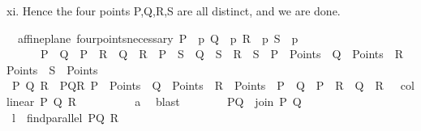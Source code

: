\begin{isabellebody}
\begin{isamarkuptext}
xi. Hence the four points P,Q,R,S are all distinct, and we are done. 
\caleb \seiji%
\end{isamarkuptext}\isamarkuptrue%
\isamarkupfalse%
\ {\isacharparenleft}{\kern0pt}\ affine{\isacharunderscore}{\kern0pt}plane{\isacharparenright}{\kern0pt}\ four{\isacharunderscore}{\kern0pt}points{\isacharunderscore}{\kern0pt}necessary{\isacharcolon}{\kern0pt}\ {\isachardoublequoteopen}{\isasymexists}{\isacharparenleft}{\kern0pt}P\ {\isacharcolon}{\kern0pt}{\isacharcolon}{\kern0pt}\ {\isacharprime}{\kern0pt}p{\isacharparenright}{\kern0pt}\ {\isacharparenleft}{\kern0pt}Q\ {\isacharcolon}{\kern0pt}{\isacharcolon}{\kern0pt}\ {\isacharprime}{\kern0pt}p{\isacharparenright}{\kern0pt}\ {\isacharparenleft}{\kern0pt}R\ {\isacharcolon}{\kern0pt}{\isacharcolon}{\kern0pt}\ {\isacharprime}{\kern0pt}p{\isacharparenright}{\kern0pt}\ {\isacharparenleft}{\kern0pt}S\ {\isacharcolon}{\kern0pt}{\isacharcolon}{\kern0pt}\ {\isacharprime}{\kern0pt}p{\isacharparenright}{\kern0pt}{\isachardot}{\kern0pt}\ \isanewline
\ \ \ \ \ \ P\ {\isasymnoteq}\ Q\ {\isasymand}\ P\ {\isasymnoteq}\ R\ {\isasymand}\ Q\ {\isasymnoteq}\ R\ {\isasymand}\ P\ {\isasymnoteq}\ S\ {\isasymand}\ Q\ {\isasymnoteq}\ S\ {\isasymand}\ R\ {\isasymnoteq}\ S\ {\isasymand}\ P\ {\isasymin}\ Points\ {\isasymand}\ Q\ {\isasymin}\ Points\ {\isasymand}\ R\ {\isasymin}\ Points\ {\isasymand}\ S\ {\isasymin}\ Points{\isachardoublequoteclose}\isanewline
%
\isadelimproof
\ \ \ \ %
\endisadelimproof
%
\isatagproof
{}\isamarkupfalse%
\ {\isacharminus}{\kern0pt}\isanewline
\ \ \ \ \ \ \isamarkupfalse%
\ P\ Q\ R\ \ PQR{\isacharcolon}{\kern0pt}\ {\isachardoublequoteopen}P\ {\isasymin}\ Points\ {\isasymand}\ Q\ {\isasymin}\ Points\ {\isasymand}\ R\ {\isasymin}\ Points\ {\isasymand}\ P\ {\isasymnoteq}\ Q\ {\isasymand}\ P\ {\isasymnoteq}\ R\ {\isasymand}\ Q\ {\isasymnoteq}\ R\ {\isasymand}\ {\isasymnot}\ collinear\ P\ Q\ R{\isachardoublequoteclose}\isanewline
\ \ \ \ \ \ \ \ \isamarkupfalse%
\ a{}\ \isamarkupfalse%
\ blast\isanewline
\ \ \ \ \ \ \isamarkupfalse%
\ {\isacharquery}{\kern0pt}PQ\ {\isacharequal}{\kern0pt}{\isachardoublequoteopen}\ join\ P\ Q{\isachardoublequoteclose}\isanewline
\ \ \ \ \ \ \isamarkupfalse%
\ {\isacharquery}{\kern0pt}l\ {\isacharequal}{\kern0pt}\ {\isachardoublequoteopen}find{\isacharunderscore}{\kern0pt}parallel\ {\isacharquery}{\kern0pt}PQ\ R{\isachardoublequoteclose}\isanewline
\ \ \ \ \ \ \isamarkupfalse%

\end{isabellebody}
